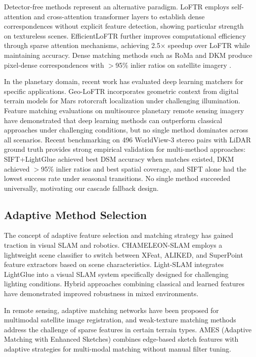 \documentclass[lettersize,journal]{IEEEtran}
\begin{document}
Detector-free methods represent an alternative paradigm. LoFTR \cite{sun2021loftr} employs self-attention and cross-attention transformer layers to establish dense correspondences without explicit feature detection, showing particular strength on textureless scenes. EfficientLoFTR \cite{wang2024efficientloftr} further improves computational efficiency through sparse attention mechanisms, achieving 2.5$\times$ speedup over LoFTR while maintaining accuracy. Dense matching methods such as RoMa \cite{edstedt2024roma} and DKM \cite{edstedt2023dkm} produce pixel-dense correspondences with $>$95\% inlier ratios on satellite imagery \cite{satellite2024benchmark}.

In the planetary domain, recent work has evaluated deep learning matchers for specific applications. Geo-LoFTR \cite{geoloftr2025} incorporates geometric context from digital terrain models for Mars rotorcraft localization under challenging illumination. Feature matching evaluations on multisource planetary remote sensing imagery \cite{ye2024planetary} have demonstrated that deep learning methods can outperform classical approaches under challenging conditions, but no single method dominates across all scenarios. Recent benchmarking on 496 WorldView-3 stereo pairs with LiDAR ground truth \cite{satellite2024benchmark} provides strong empirical validation for multi-method approaches: SIFT+LightGlue achieved best DSM accuracy when matches existed, DKM achieved $>$95\% inlier ratios and best spatial coverage, and SIFT alone had the lowest success rate under seasonal transitions. No single method succeeded universally, motivating our cascade fallback design.

\subsection{Adaptive Method Selection}

The concept of adaptive feature selection and matching strategy has gained traction in visual SLAM and robotics. CHAMELEON-SLAM \cite{syed2026chameleon} employs a lightweight scene classifier to switch between XFeat, ALIKED, and SuperPoint feature extractors based on scene characteristics. Light-SLAM \cite{lightslam2024} integrates LightGlue into a visual SLAM system specifically designed for challenging lighting conditions. Hybrid approaches combining classical and learned features \cite{hybrid2026} have demonstrated improved robustness in mixed environments.

In remote sensing, adaptive matching networks \cite{adaptive2023} have been proposed for multimodal satellite image registration, and weak-texture matching methods \cite{weaktexture2023} address the challenge of sparse features in certain terrain types. AMES (Adaptive Matching with Enhanced Sketches) combines edge-based sketch features with adaptive strategies for multi-modal matching without manual filter tuning.
\end{document}
